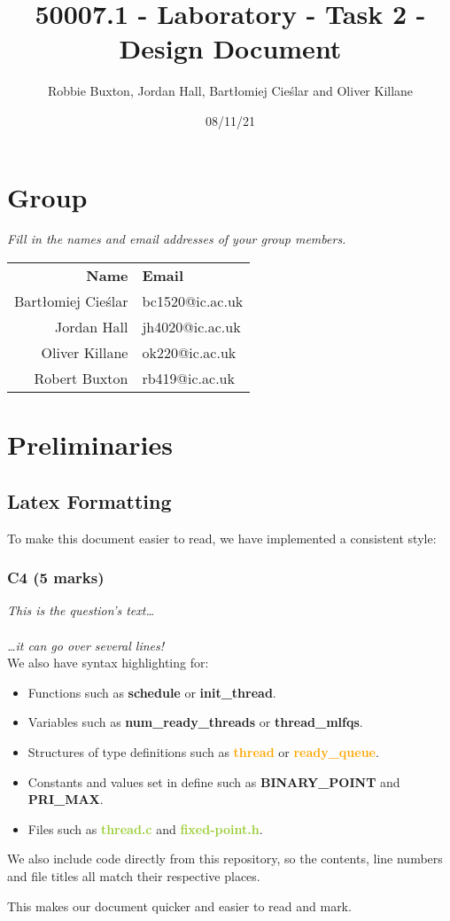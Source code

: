 \documentclass{report}
\title{50007.1 - Laboratory - Task 2 - Design Document}
\author{Robbie Buxton, Jordan Hall, Bartłomiej Cieślar and Oliver Killane}
\date{08/11/21}
\newcommand{\question}[1]{\textit{#1} \ }
\newcommand{\fun}[1]{\textcolor{Emerald}{\textbf{#1}}}
\newcommand{\file}[1]{\textcolor{YellowGreen}{\textbf{#1}}}
\newcommand{\struct}[1]{\textcolor{orange}{\textbf{#1}}}
\newcommand{\var}[1]{\textcolor{RoyalPurple}{\textbf{#1}}}
\newcommand{\const}[1]{\textcolor{BrickRed}{\textbf{#1}}}
\newcommand{\pintoscode}[4]{}
\newcommand{\pintosfile}[3]{\pintoscode{#1}{#2}{\file{#3}}{#3}}
\begin{document}
    \maketitle

    \section*{Group}
        \question{Fill in the names and email addresses of your group members.}
        \begin{center}
            \begin{tabular}{r l}
                \textbf{Name} & \textbf{Email} \\
                Bartłomiej Cieślar & bc1520@ic.ac.uk \\
                Jordan Hall & jh4020@ic.ac.uk \\
                Oliver Killane & ok220@ic.ac.uk \\
                Robert Buxton & rb419@ic.ac.uk \\
            \end{tabular}
        \end{center}
    
    \section*{Preliminaries}
        \subsection*{Latex Formatting}
        To make this document easier to read, we have implemented a consistent style:
        \subsubsection*{C4 (5 marks)}
        \question{This is the question's text\dots
        \\
        \\ \dots it can go over several lines!}
        \\ We also have syntax highlighting for:
        \begin{itemize}
            \item Functions such as \fun{schedule} or \fun{init\_thread}.
            \item Variables such as \var{num\_ready\_threads} or \var{thread\_mlfqs}.
            \item Structures of type definitions such as \struct{thread} or \struct{ready\_queue}.
            \item Constants and values set in define such as \const{BINARY\_POINT} and \const{PRI\_MAX}.
            \item Files such as \file{thread.c} and \file{fixed-point.h}.
        \end{itemize}
        We also include code directly from this repository, so the contents, line numbers and file titles all match their respective places.
        \pintosfile{96}{108}{syscall.c}
        This makes our document quicker and easier to read and mark.
    
\end{document}
